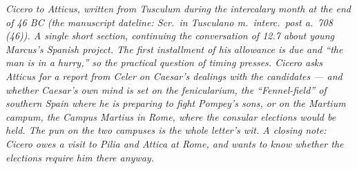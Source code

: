 
\textit{Cicero to Atticus, written from Tusculum during
the intercalary month at the end of 46 BC (the
manuscript dateline: \textit{Scr.\ in Tusculano m.\
interc.\ post a.\ 708 (46)}). A single short section,
continuing the conversation of 12.7 about young
Marcus's Spanish project. The first installment of his
allowance is due and ``the man is in a hurry,'' so the
practical question of timing presses. Cicero asks
Atticus for a report from Celer on Caesar's dealings
with the candidates --- and whether Caesar's own mind
is set on the \textit{fenicularium}, the
``Fennel-field'' of southern Spain where he is
preparing to fight Pompey's sons, or on the
\textit{Martium campum}, the Campus Martius in Rome,
where the consular elections would be held. The pun
on the two campuses is the whole letter's wit. A
closing note: Cicero owes a visit to Pilia and Attica
at Rome, and wants to know whether the elections
require him there anyway.}
